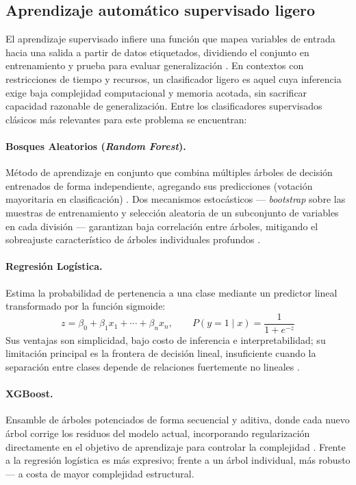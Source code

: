 \documentclass[12pt,oneside,spanish]{book}
\begin{document}
\subsection{Aprendizaje automático supervisado ligero}

El aprendizaje supervisado infiere una función que mapea variables de entrada hacia una salida a partir de datos etiquetados, dividiendo el conjunto en entrenamiento y prueba para evaluar generalización \cite{Pandey2019}. En contextos con restricciones de tiempo y recursos, un clasificador ligero es aquel cuya inferencia exige baja complejidad computacional y memoria acotada, sin sacrificar capacidad razonable de generalización. Entre los clasificadores supervisados clásicos más relevantes para este problema se encuentran:

\paragraph{Bosques Aleatorios (\textit{Random Forest}).} Método de aprendizaje en conjunto que combina múltiples árboles de decisión entrenados de forma independiente, agregando sus predicciones (votación mayoritaria en clasificación) \cite{IBMRF2026}. Dos mecanismos estocásticos --- \textit{bootstrap} sobre las muestras de entrenamiento y selección aleatoria de un subconjunto de variables en cada división --- garantizan baja correlación entre árboles, mitigando el sobreajuste característico de árboles individuales profundos \cite{IBMRF2026}.

\paragraph{Regresión Logística.} Estima la probabilidad de pertenencia a una clase mediante un predictor lineal transformado por la función sigmoide:
\begin{equation}
z = \beta_{0} + \beta_{1}x_{1} + \cdots + \beta_{n}x_{n}, \qquad P(y=1\mid x) = \frac{1}{1+e^{-z}}
\end{equation}
Sus ventajas son simplicidad, bajo costo de inferencia e interpretabilidad; su limitación principal es la frontera de decisión lineal, insuficiente cuando la separación entre clases depende de relaciones fuertemente no lineales \cite{IBMLR2026}.

\paragraph{XGBoost.} Ensamble de árboles potenciados de forma secuencial y aditiva, donde cada nuevo árbol corrige los residuos del modelo actual, incorporando regularización directamente en el objetivo de aprendizaje para controlar la complejidad \cite{IBMXGB2026}. Frente a la regresión logística es más expresivo; frente a un árbol individual, más robusto --- a costa de mayor complejidad estructural.
\end{document}
